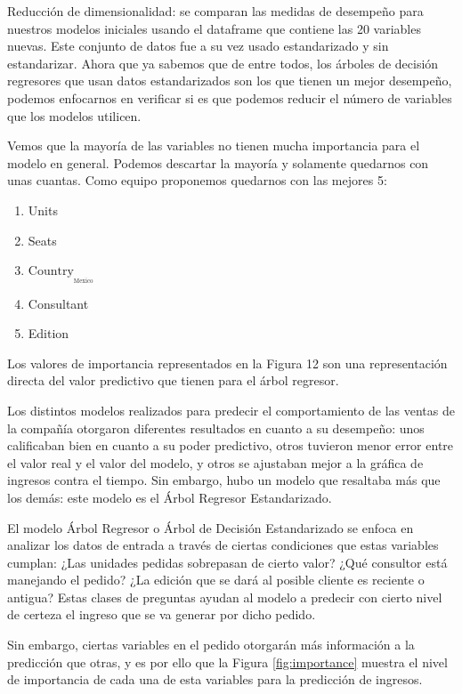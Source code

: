 \documentclass{article}
\begin{document}
        Reducción de dimensionalidad: se comparan las medidas de desempeño para nuestros modelos iniciales usando el dataframe que contiene las 20 variables nuevas. Este conjunto de datos fue a su vez usado estandarizado y sin estandarizar. Ahora que ya sabemos que de entre todos, los árboles de decisión regresores que usan datos estandarizados son los que tienen un mejor desempeño, podemos enfocarnos en verificar si es que podemos reducir el número de variables que los modelos utilicen.
        
        Vemos que la mayoría de las variables no tienen mucha importancia para el modelo en general. Podemos descartar la mayoría y solamente quedarnos con unas cuantas. Como equipo proponemos quedarnos con las mejores 5:
        
        \begin{enumerate}
            \item Units
            \item Seats
            \item $\text{Country}__\text{Mexico}$
            \item Consultant
            \item Edition 
        \end{enumerate}
        
        Los valores de importancia representados en la Figura 12 son una representación directa del valor predictivo que tienen para el árbol regresor.
        
        Los distintos modelos realizados para predecir el comportamiento de las ventas de la compañía otorgaron diferentes resultados en cuanto a su desempeño: unos calificaban bien en cuanto a su poder predictivo, otros tuvieron menor error entre el valor real y el valor del modelo, y otros se ajustaban mejor a la gráfica de ingresos contra el tiempo. Sin embargo, hubo un modelo que resaltaba más que los demás: este modelo es el Árbol Regresor Estandarizado.
        
        El modelo Árbol Regresor o Árbol de Decisión Estandarizado se enfoca en analizar los datos de entrada a través de ciertas condiciones que estas variables cumplan: ¿Las unidades pedidas sobrepasan de cierto valor? ¿Qué consultor está manejando el pedido? ¿La edición que se dará al posible cliente es reciente o antigua? Estas clases de preguntas ayudan al modelo a predecir con cierto nivel de certeza el ingreso que se va generar por dicho pedido.
        
        Sin embargo, ciertas variables en el pedido otorgarán más información a la predicción que otras, y es por ello que la Figura \ref{fig:importance} muestra el nivel de importancia de cada una de esta variables para la predicción de ingresos.
        
\end{document}
